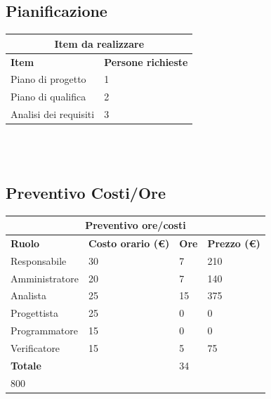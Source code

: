 \documentclass[12pt]{article}
\begin{document}
\subsection{Pianificazione}
\begin{center}
    \begin{tabularx}{\textwidth}{|X|X|}
        \hline
        \multicolumn{2}{|c|}{\textbf{Item da realizzare}}\\
        \hline
        \hline
        \textbf{Item} & \textbf{Persone richieste}\\
        \hline
        Piano di progetto & 1\\
        \hline
        Piano di qualifica & 2\\
        \hline
        Analisi dei requisiti & 3 \\
        \hline
    \end{tabularx}\\[8pt]
    \mbox{}\\
\end{center}
\subsection{Preventivo Costi/Ore}
\begin{center}
    \begin{tabularx}{\textwidth}{|X|X|X|X|}
        \hline
        \multicolumn{4}{|c|}{\textbf{Preventivo ore/costi}}\\
        \hline
        \hline
        \textbf{Ruolo} & \textbf{Costo orario (\euro)} & \textbf{Ore} & \textbf{Prezzo (\euro)}\\
        \hline
        Responsabile    & 30 & 7  & 210\\   
        \hline
        Amministratore  & 20 & 7  & 140\\ 
        \hline
        Analista        & 25 & 15  & 375\\ 
        \hline
        Progettista     & 25 & 0  & 0\\
        \hline
        Programmatore   & 15 & 0  & 0\\
        \hline
        Verificatore    & 15 & 5  & 75\\
        \hline
        \hline
        \textbf{Totale} &    & 34 & \\ 800\\
        \hline
    \end{tabularx}\\[8pt]
    \mbox{}\\
\end{center}
\end{document}
